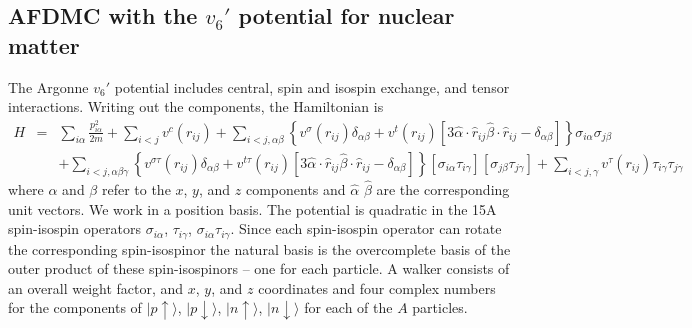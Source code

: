  \subsection{AFDMC with the $v_6'$ potential for nuclear matter}
 The Argonne $v_6'$ potential includes central, spin and isospin exchange,
 and tensor interactions. Writing out the components, the Hamiltonian is
 \begin{eqnarray}
 \label{eq.hv6}
 H &=& \sum_{i\alpha} \frac{p_{i\alpha}^2}{2m}
 + \sum_{i<j} v^c(r_{ij})
 + \sum_{i<j,\alpha\beta} \left \{
 v^\sigma(r_{ij})\delta_{\alpha\beta}+v^t(r_{ij})
 \left [  3 \hat \alpha \cdot \hat r_{ij}
 \hat \beta \cdot \hat r_{ij} -\delta_{\alpha\beta} \right] \right \}
 \sigma_{i\alpha}\sigma_{j\beta}
 \nonumber\\
 &&
 + \sum_{i<j,\alpha\beta\gamma} \left \{
 v^{\sigma\tau}(r_{ij})\delta_{\alpha\beta}+v^{t\tau}(r_{ij})
 \left [  3 \hat \alpha \cdot \hat r_{ij}
 \hat \beta \cdot \hat r_{ij} -\delta_{\alpha\beta} \right] \right \}
 [\sigma_{i\alpha}\tau_{i\gamma}][\sigma_{j\beta}\tau_{j\gamma}]
 + \sum_{i<j,\gamma}
 v^\tau(r_{ij})\tau_{i\gamma}\tau_{j\gamma}
 \end{eqnarray}
 where $\alpha$ and $\beta$ refer to the $x$, $y$, and $z$ components
 and $\hat \alpha$ $\hat \beta$ are the corresponding unit vectors.
 We work in a position basis. The potential is quadratic in
 the 15A spin-isospin operators
 $\sigma_{i\alpha}$, $\tau_{i\gamma}$, $\sigma_{i\alpha}\tau_{i\gamma}$.
 Since each spin-isospin operator can rotate the corresponding spin-isospinor
 the natural basis is the overcomplete basis of the outer product of these
 spin-isospinors -- one for each particle. A walker consists of an overall
 weight factor, and
 $x$, $y$, and $z$ coordinates
 and four
 complex numbers for the components of
 $|p\uparrow\rangle$, $|p\downarrow\rangle$,
 $|n\uparrow\rangle$, $|n\downarrow\rangle$ for
 each of the $A$ particles.
 
